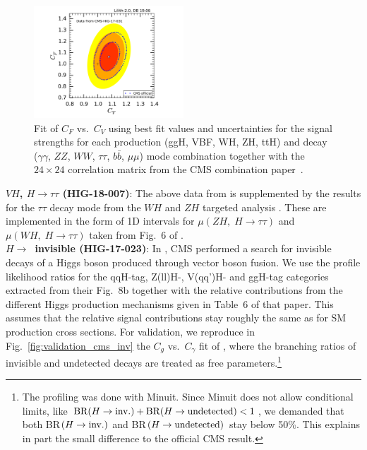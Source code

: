 \begin{figure}[h!]\centering
\includegraphics[width=0.5\textwidth]{validation/CMS/HIG-17-031-CVCF.pdf}
\caption{Fit of $C_F$ vs.\ $C_V$ using best fit values and uncertainties for the signal strengths for each production (ggH, VBF, WH, ZH, ttH) 
and decay ($\gamma\gamma$, $ZZ$, $WW$, $\tau\tau$, $b\bar b$, $\mu\mu$) mode combination together with the 
$24\times 24$ correlation matrix from the CMS combination paper~\cite{Sirunyan:2018koj}.}
\label{fig:validation_cms_combination}
\end{figure}


{\bf\boldmath $VH$, $H\to\tau\tau$ (HIG-18-007)}: The above data from \cite{Sirunyan:2018koj} is supplemented by the results 
for the $\tau\tau$ decay mode from the $WH$ and $ZH$ targeted analysis \cite{Sirunyan:2018cpi}. These are implemented in the 
form of 1D intervals for $\mu(ZH,\;H\to\tau\tau)$ and $\mu(WH,\;H\to\tau\tau)$ taken from Fig.~6 of \cite{Sirunyan:2018cpi}. \\

{\bf\boldmath $H\to$~invisible (HIG-17-023)}: 
In \cite{Sirunyan:2018owy}, CMS performed a search for invisible decays of a Higgs boson produced through vector boson fusion. 
We use the profile likelihood ratios for the qqH-tag, Z(ll)H-, V(qq')H- and ggH-tag categories extracted 
from their Fig.~8b together with the relative contributions from the different Higgs production mechanisms  
given in Table~6 of that paper. This assumes that the relative signal contributions stay roughly the same as for 
SM production cross sections. For validation, we reproduce in Fig.~\ref{fig:validation_cms_inv}
 the $C_g$ vs.\ $C_\gamma$ fit of \cite{Sirunyan:2018koj}, where the branching ratios of invisible and undetected decays 
are treated as free parameters.\footnote{The profiling was done with Minuit. Since Minuit does not allow conditional limits, like 
${\rm BR}(H\to {\rm inv.})+{\rm BR}(H\to {\rm undetected})<1$, we demanded that both BR$(H\to {\rm inv.})$ and BR$(H\to {\rm undetected})$ 
stay below 50\%. This explains in part the small difference to the official CMS result.}

